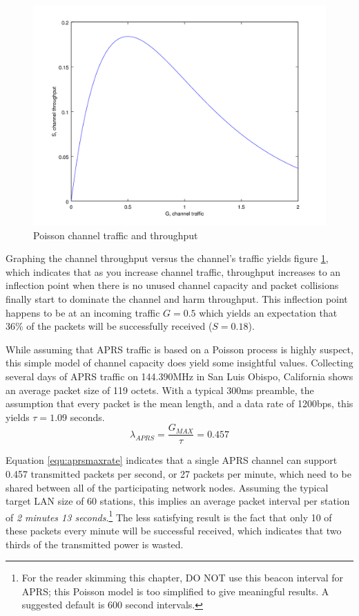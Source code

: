 \begin{figure}
	\centering
	\includegraphics[width=1.0\textwidth]{src/octave/poissonthroughput}
	\caption{Poisson channel traffic and throughput}
	\label{fig:SGpoisson}
\end{figure}
Graphing the channel throughput versus the channel's traffic yields figure 
\ref{fig:SGpoisson}, which indicates that as you increase channel traffic, 
throughput increases to an inflection point when there is no unused channel capacity
and packet collisions finally start to dominate
the channel and harm throughput. This inflection point happens to be at
an incoming traffic $G = 0.5$ which yields an expectation that 36\% of the packets
will be successfully received ($S = 0.18$).

While assuming that APRS traffic is based on a Poisson process is 
highly suspect, this simple model of channel capacity does yield some insightful 
values. 
Collecting several days of APRS traffic on 144.390MHz in San Luis Obispo, California
shows an average packet size of 119 octets. With a typical 300ms preamble,
the assumption that every packet is the mean length,
and a data rate of 1200bps, this yields $\tau = 1.09$ seconds.
\begin{equation}
	\lambda_{APRS} = \frac{G_{MAX}}{\tau} = 0.457
	\label{equ:aprsmaxrate}
\end{equation}

Equation \ref{equ:aprsmaxrate} indicates that a single APRS channel can support
0.457 transmitted packets per second, or
27 packets per minute, which need to be shared between
all of the participating network nodes.
Assuming the typical target LAN size of 60 stations, 
this implies an average packet interval per station
of \emph{2 minutes 13 seconds}.\footnote{For the reader skimming this chapter, DO NOT
	use this beacon interval for APRS; this Poisson model is too simplified to give
meaningful results. A suggested default is 600 second intervals.}
The less satisfying result is the fact that only 10 of these packets every minute will be
successful received, which indicates that
two thirds of the transmitted power is wasted.

